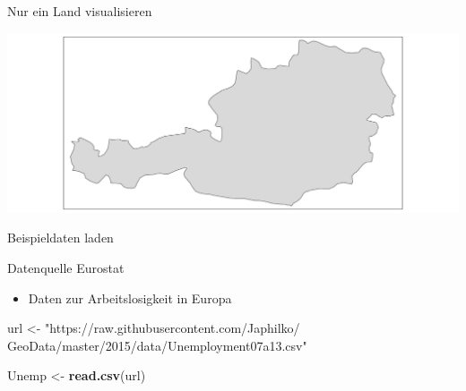 \documentclass[ignorenonframetext,]{beamer}
\newenvironment{Shaded}{\begin{snugshade}}{\end{snugshade}}
\newcommand{\KeywordTok}[1]{\textcolor[rgb]{0.13,0.29,0.53}{\textbf{#1}}}
\newcommand{\StringTok}[1]{\textcolor[rgb]{0.31,0.60,0.02}{#1}}
\newcommand{\OperatorTok}[1]{\textcolor[rgb]{0.81,0.36,0.00}{\textbf{#1}}}
\newcommand{\NormalTok}[1]{#1}
\providecommand{\tightlist}{%
  \setlength{\itemsep}{0pt}\setlength{\parskip}{0pt}}
\begin{document}
\begin{frame}[fragile]{Nur ein Land visualisieren}

\begin{Shaded}
\end{Shaded}

\includegraphics{tmap_files/figure-beamer/unnamed-chunk-48-1.pdf}

\end{frame}

\begin{frame}[fragile]{Beispieldaten laden}

\begin{block}{Datenquelle Eurostat}

\begin{itemize}
\tightlist
\item
  Daten zur Arbeitslosigkeit in Europa
\end{itemize}

\begin{Shaded}
\begin{Highlighting}[]
\NormalTok{url <-}\StringTok{ "https://raw.githubusercontent.com/Japhilko/}
\StringTok{GeoData/master/2015/data/Unemployment07a13.csv"}

\NormalTok{Unemp <-}\StringTok{ }\KeywordTok{read.csv}\NormalTok{(url) }
\end{Highlighting}
\end{Shaded}

\end{block}

\end{frame}
\end{document}
